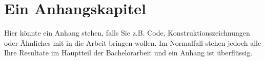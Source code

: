 \chapter{Ein Anhangskapitel}

Hier könnte ein Anhang stehen, falls Sie z.B. Code, Konstruktionszeichnungen oder Ähnliches mit in die Arbeit bringen wollen. Im Normalfall stehen jedoch alle Ihre Resultate im Hauptteil der Bachelorarbeit und ein Anhang ist überflüssig.
